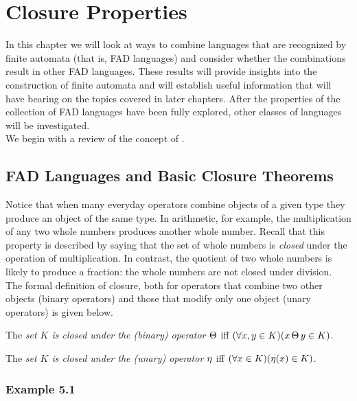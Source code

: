 \chapter{Closure Properties}\label{ch-5}

In this chapter we will look at ways to combine languages that are recognized
by finite automata (that is, FAD languages) and consider whether the
combinations result in other FAD languages. These results will provide insights
into the construction of finite automata and will establish useful information
that will have bearing on the topics covered in later chapters. After the
properties of the collection of FAD languages have been fully explored, other
classes of languages will be investigated. \\
We begin with a review of the concept of \emph{}.

\section{FAD Languages and Basic Closure Theorems}\label{sec-5.1}

Notice that when many everyday operators combine objects of a given type they
produce an object of the same type. In arithmetic, for example, the
multiplication of any two whole numbers produces another whole number. Recall
that this property is described by saying that the set of whole numbers is
\emph{closed} under the operation of multiplication. In contrast, the
quotient of two whole numbers is likely to produce a fraction: the whole numbers
are not closed under division. The formal definition of closure, both for
operators that combine two other objects (binary operators) and those that
modify only one object (unary operators) is given below.

\begin{dfn}\label{dfn-5.1}
The \emph{set $K$ is closed under the (binary) operator $\operatorname{\Theta}$} iff
$(\forall x,y \in K)(x\operatorname{\Theta} y \in K)$.
\end{dfn}

\begin{dfn}\label{dfn-5.2}
The \emph{set $K$ is closed under the (unary) operator $\operatorname{\eta}$} iff
$(\forall x \in K)(\operatorname{\eta}(x) \in K)$.
\end{dfn}

\subsection*{Example 5.1}

